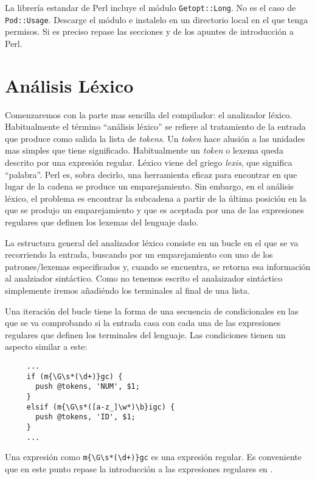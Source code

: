 La librería estandar de Perl incluye el módulo \verb|Getopt::Long|. 
No es el caso de \verb|Pod::Usage|. Descarge el módulo e instalelo
en un directorio local en el que tenga permisos. Si es preciso repase las secciones
 y   de los apuntes de 
introducción a Perl.

\section{Análisis Léxico}
\label{section:analisislexico}
Comenzaremos con la parte mas sencilla del compilador: el analizador 
léxico. 
Habitualmente el término ``análisis léxico'' se refiere al tratamiento
de la entrada que produce como salida
la lista de \emph{tokens}. Un \emph{token} hace alusión 
a las unidades mas simples que tiene significado. Habitualmente 
un \emph{token} o lexema queda descrito por una expresión regular.
Léxico viene del griego \emph{lexis}, que significa ``palabra''.
Perl es, sobra decirlo, una herramienta eficaz para encontrar en que lugar 
de la cadena se produce un emparejamiento.
Sin embargo, en el análisis léxico, el problema es encontrar la subcadena
a partir de la última posición en la que se produjo un emparejamiento
y que es aceptada por una de las expresiones
regulares que definen los lexemas del lenguaje dado.

La estructura general del analizador léxico consiste en un bucle en el que se va
recorriendo la entrada, buscando por un emparejamiento con 
uno de los patrones/lexemas especificados y, cuando se encuentra, se retorna esa información
al analziador sintáctico. Como no tenemos escrito el analaizador sintáctico 
simplemente iremos añadiéndo los terminales al final de una lista.

Una iteración del bucle tiene la forma de una secuencia de condicionales
en las que se va comprobando si la entrada casa con cada una de las expresiones regulares
que definen los terminales del lenguaje. Las condiciones tienen un aspecto similar a este:

\begin{verbatim}
     ...
     if (m{\G\s*(\d+)}gc) {
       push @tokens, 'NUM', $1;
     } 
     elsif (m{\G\s*([a-z_]\w*)\b}igc) {
       push @tokens, 'ID', $1;
     } 
     ...
\end{verbatim}

Una expresión como \verb#m{\G\s*(\d+)}gc# es una expresión regular.
Es conveniente que en este punto repase la introducción a las 
expresiones regulares en 
. 

